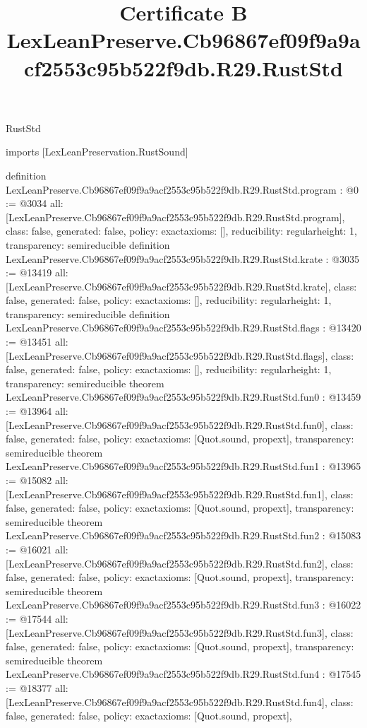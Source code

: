\begin{lexlean}{RustStd}
\title{Certificate B LexLeanPreserve.Cb96867ef09f9a9acf2553c95b522f9db.R29.RustStd}
\begin{coremodule}
imports [LexLeanPreservation.RustSound]

definition LexLeanPreserve.Cb96867ef09f9a9acf2553c95b522f9db.R29.RustStd.program : @0 := @3034 {
  all: [LexLeanPreserve.Cb96867ef09f9a9acf2553c95b522f9db.R29.RustStd.program],
  class: false,
  generated: false,
  policy: exact{axioms: []},
  reducibility: regular{height: 1},
  transparency: semireducible
}
definition LexLeanPreserve.Cb96867ef09f9a9acf2553c95b522f9db.R29.RustStd.krate : @3035 := @13419 {
  all: [LexLeanPreserve.Cb96867ef09f9a9acf2553c95b522f9db.R29.RustStd.krate],
  class: false,
  generated: false,
  policy: exact{axioms: []},
  reducibility: regular{height: 1},
  transparency: semireducible
}
definition LexLeanPreserve.Cb96867ef09f9a9acf2553c95b522f9db.R29.RustStd.flags : @13420 := @13451 {
  all: [LexLeanPreserve.Cb96867ef09f9a9acf2553c95b522f9db.R29.RustStd.flags],
  class: false,
  generated: false,
  policy: exact{axioms: []},
  reducibility: regular{height: 1},
  transparency: semireducible
}
theorem LexLeanPreserve.Cb96867ef09f9a9acf2553c95b522f9db.R29.RustStd.fun0 : @13459 := @13964 {
  all: [LexLeanPreserve.Cb96867ef09f9a9acf2553c95b522f9db.R29.RustStd.fun0],
  class: false,
  generated: false,
  policy: exact{axioms: [Quot.sound, propext]},
  transparency: semireducible
}
theorem LexLeanPreserve.Cb96867ef09f9a9acf2553c95b522f9db.R29.RustStd.fun1 : @13965 := @15082 {
  all: [LexLeanPreserve.Cb96867ef09f9a9acf2553c95b522f9db.R29.RustStd.fun1],
  class: false,
  generated: false,
  policy: exact{axioms: [Quot.sound, propext]},
  transparency: semireducible
}
theorem LexLeanPreserve.Cb96867ef09f9a9acf2553c95b522f9db.R29.RustStd.fun2 : @15083 := @16021 {
  all: [LexLeanPreserve.Cb96867ef09f9a9acf2553c95b522f9db.R29.RustStd.fun2],
  class: false,
  generated: false,
  policy: exact{axioms: [Quot.sound, propext]},
  transparency: semireducible
}
theorem LexLeanPreserve.Cb96867ef09f9a9acf2553c95b522f9db.R29.RustStd.fun3 : @16022 := @17544 {
  all: [LexLeanPreserve.Cb96867ef09f9a9acf2553c95b522f9db.R29.RustStd.fun3],
  class: false,
  generated: false,
  policy: exact{axioms: [Quot.sound, propext]},
  transparency: semireducible
}
theorem LexLeanPreserve.Cb96867ef09f9a9acf2553c95b522f9db.R29.RustStd.fun4 : @17545 := @18377 {
  all: [LexLeanPreserve.Cb96867ef09f9a9acf2553c95b522f9db.R29.RustStd.fun4],
  class: false,
  generated: false,
  policy: exact{axioms: [Quot.sound, propext]},
}
\end{coremodule}
\end{lexlean}

